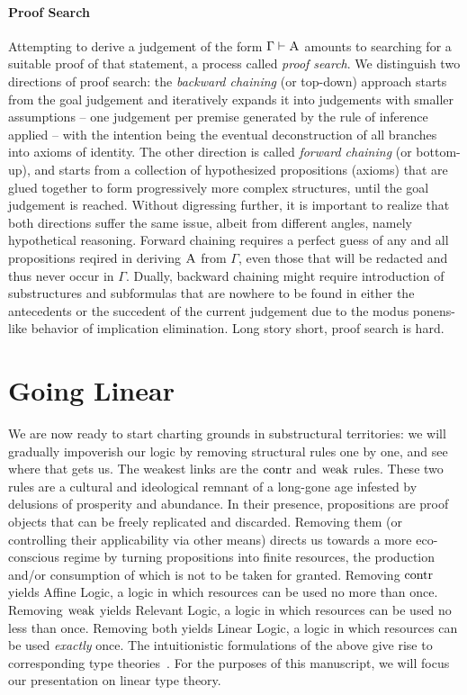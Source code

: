 \paragraph{Proof Search}
Attempting to derive a judgement of the form $\Gamma \vdash \normalfont\textsc{A}$ amounts to searching for a suitable proof of that statement, a process called \textit{proof search}.
We distinguish two directions of proof search: the \textit{backward chaining} (or top-down) approach starts from the goal judgement and iteratively expands it into judgements with smaller assumptions -- one judgement per premise generated by the rule of inference applied -- with the intention being the eventual deconstruction of all branches into axioms of identity.
The other direction is called \textit{forward chaining} (or bottom-up), and starts from a collection of hypothesized propositions (axioms) that are glued together to form progressively more complex structures, until the goal judgement is reached.
Without digressing further, it is important to realize that both directions suffer the same issue, albeit from different angles, namely hypothetical reasoning.
Forward chaining requires a perfect guess of any and all propositions reqired in deriving $\normalfont\textsc{A}$ from $\Gamma$, even those that will be redacted and thus never occur in $\Gamma$.
Dually, backward chaining might require introduction of substructures and subformulas that are nowhere to be found in either the antecedents or the succedent of the current judgement due to the modus ponens-like behavior of implication elimination.
Long story short, proof search is hard.

\section{Going Linear}\label{section:linear_type_theory}
We are now ready to start charting grounds in substructural territories: we will gradually impoverish our logic by removing structural rules one by one, and see where that gets us. 
The weakest links are the $\mathrm{contr}{}$ and $\mathrm{weak}{}$ rules.
These two rules are a cultural and ideological remnant of a long-gone age infested by delusions of prosperity and abundance.
In their presence, propositions are proof objects that can be freely replicated and discarded.
Removing them (or controlling their applicability via other means) directs us towards a more eco-conscious regime by turning propositions into finite resources, the production and/or consumption of which is not to be taken for granted.
Removing $\mathrm{contr}{}$ yields Affine Logic, a logic in which resources can be used no more than once.
Removing $\mathrm{weak}{}$ yields Relevant Logic, a logic in which resources can be used no less than once.
Removing both yields Linear Logic, a logic in which resources can be used \textit{exactly} once.
The intuitionistic formulations of the above give rise to corresponding type theories~\cite{pierce2004advanced}.
For the purposes of this manuscript, we will focus our presentation on linear type theory.


